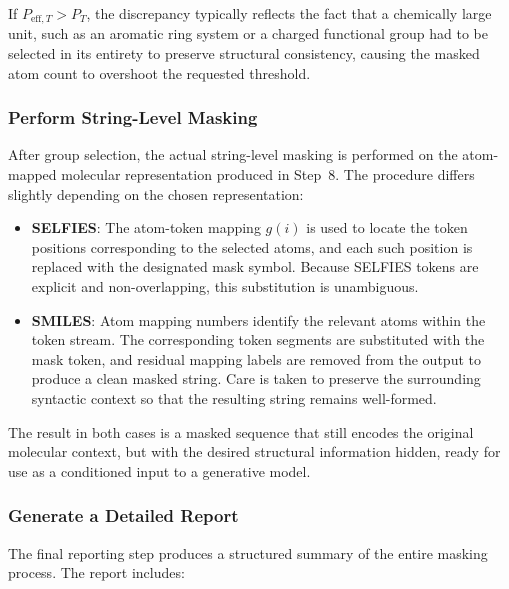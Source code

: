 \documentclass[a4paper,12pt]{article}
\begin{document}
If $P_{\text{eff},T} > P_T$, the discrepancy typically reflects the fact that a
chemically large unit, such as an aromatic ring system or a charged functional group
had to be selected in its entirety to preserve structural consistency,
causing the masked atom count to overshoot the requested threshold.


\subsubsection{Perform String-Level Masking}

After group selection, the actual string-level masking is performed on the
atom-mapped molecular representation produced in Step~8. The procedure differs
slightly depending on the chosen representation:

\begin{itemize}
    \item \textbf{SELFIES}: The atom-token mapping $g(i)$ is used to locate the
    token positions corresponding to the selected atoms, and each such position
    is replaced with the designated mask symbol. Because SELFIES tokens are explicit and non-overlapping, this substitution is unambiguous.

    \item \textbf{SMILES}: Atom mapping numbers identify the relevant atoms
    within the token stream. The corresponding token segments are substituted
    with the mask token, and residual mapping labels are removed from the
    output to produce a clean masked string. Care is taken to preserve the
    surrounding syntactic context so that the resulting string remains
    well-formed.
\end{itemize}

\noindent
The result in both cases is a masked sequence that still encodes the original
molecular context, but with the desired structural information hidden, ready
for use as a conditioned input to a generative model.


\subsubsection{Generate a Detailed Report}

The final reporting step produces a structured summary of the entire masking
process. The report includes:
\end{document}
